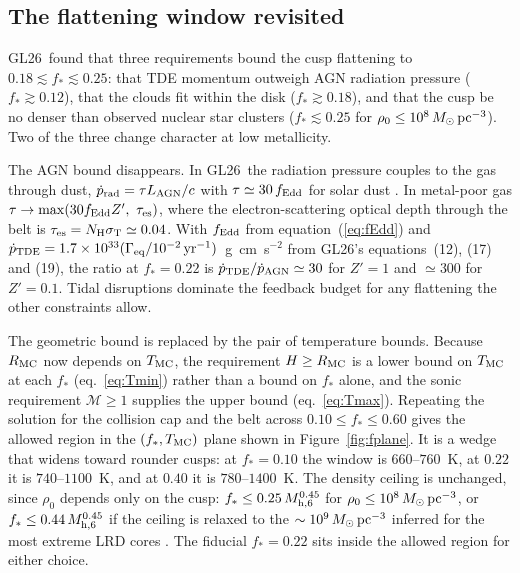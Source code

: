 \documentclass[twocolumn,pdftex]{aastex701}
\newcommand{\msun}{M_{\odot}}
\newcommand{\mhsix}{M_{\rm h,6}}
\newcommand{\Zp}{Z'}
\newcommand{\fst}{f_{\ast}}
\newcommand{\Geq}{\Gamma_{\rm eq}}
\newcommand{\GL}{GL26}
\begin{document}
\subsection{The flattening window revisited}\label{sec:fwindow}

\GL\ found that three requirements bound the cusp flattening to $0.18\lesssim\fst\lesssim0.25$: that TDE momentum outweigh AGN radiation pressure ($\fst\gtrsim0.12$), that the clouds fit within the disk ($\fst\gtrsim0.18$), and that the cusp be no denser than observed nuclear star clusters ($\fst\lesssim0.25$ for $\rho_0\le10^{8}\,\msun\,{\rm pc^{-3}}$). Two of the three change character at low metallicity.

The AGN bound disappears. In \GL\ the radiation pressure couples to the gas through dust, $\dot p_{\rm rad} = \tau L_{\rm AGN}/c$ with $\tau\simeq30\,f_{\rm Edd}$ for solar dust \citep{Li:2001a,Nenkova:2008b,Netzer:2006a}. In metal-poor gas $\tau\to\max(30f_{\rm Edd}\Zp,\ \tau_{\rm es})$, where the electron-scattering optical depth through the belt is $\tau_{\rm es} = N_{\rm H}\sigma_{\rm T}\simeq0.04$. With $f_{\rm Edd}$ from equation~(\ref{eq:fEdd}) and $\dot p_{\rm TDE} = 1.7\times10^{33}(\Geq/10^{-2}\,{\rm yr^{-1}})$~g~cm~s$^{-2}$ from \GL's equations~(12), (17) and (19), the ratio at $\fst=0.22$ is $\dot p_{\rm TDE}/\dot p_{\rm AGN}\simeq30$ for $\Zp=1$ and $\simeq300$ for $\Zp=0.1$. Tidal disruptions dominate the feedback budget for any flattening the other constraints allow.

The geometric bound is replaced by the pair of temperature bounds. Because $R_{\rm MC}$ now depends on $T_{\rm MC}$, the requirement $H\ge R_{\rm MC}$ is a lower bound on $T_{\rm MC}$ at each $\fst$ (eq.~\ref{eq:Tmin}) rather than a bound on $\fst$ alone, and the sonic requirement $\mathcal{M}\ge1$ supplies the upper bound (eq.~\ref{eq:Tmax}). Repeating the solution for the collision cap and the belt across $0.10\le\fst\le0.60$ gives the allowed region in the $(\fst,T_{\rm MC})$ plane shown in Figure~\ref{fig:fplane}. It is a wedge that widens toward rounder cusps: at $\fst = 0.10$ the window is $660$--$760$~K, at $0.22$ it is $740$--$1100$~K, and at $0.40$ it is $780$--$1400$~K. The density ceiling is unchanged, since $\rho_0$ depends only on the cusp: $\fst\le0.25\,\mhsix^{0.45}$ for $\rho_0\le10^{8}\,\msun\,{\rm pc^{-3}}$, or $\fst\le0.44\,\mhsix^{0.45}$ if the ceiling is relaxed to the $\sim10^{9}\,\msun\,{\rm pc^{-3}}$ inferred for the most extreme LRD cores \citep{Pacucci:2025a}. The fiducial $\fst = 0.22$ sits inside the allowed region for either choice.
\end{document}
